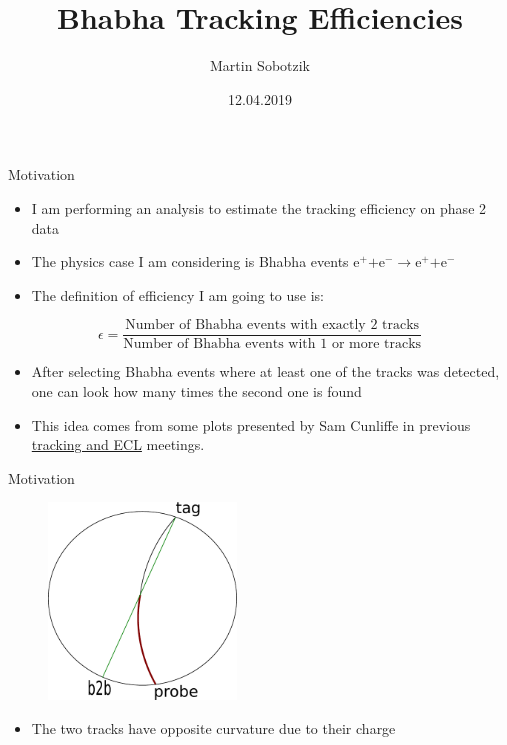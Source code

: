 \documentclass[10pt]{beamer}
\title{Bhabha Tracking Efficiencies}
\date{12.04.2019}
\author{Martin Sobotzik}
\institute{Johannes Gutenberg Universit\"at Mainz}
\begin{document}
\maketitle
{%



\begin{frame}{Motivation}

\begin{itemize}	
	\item I am performing an analysis to estimate the tracking efficiency on phase 2 data
	\item The physics case I am considering is Bhabha events $\textrm{e}^+ \textrm{+e}^- \rightarrow \textrm{e}^+ \textrm{+e}^- $ 
	\item The definition of efficiency I am going to use is:

\end{itemize}
	\begin{equation*}
		\epsilon = \frac{\textrm{Number of Bhabha events with exactly 2 tracks}}{\textrm{Number of Bhabha events with 1 or more tracks}}
	\end{equation*}
	
	\begin{itemize}
		\item After selecting Bhabha events where at least one of the tracks was detected, one can look how many times the second one is found
		\item  This idea comes from some plots presented by Sam Cunliffe in previous  \href{https://confluence.desy.de/display/BI/ECL+Meetings?preview=/84320165/109161400/SCunliffe181123-ECL.pdf}{tracking and ECL} meetings.
	\end{itemize}





\end{frame}
	
	
	\begin{frame}{Motivation}
		\begin{figure}
			\includegraphics[width=5cm]{Plots/b2b}
		\end{figure}
	\begin{itemize}
	\item The two tracks have opposite curvature due to their charge
\end{itemize}



\end{frame}}
\end{document}

